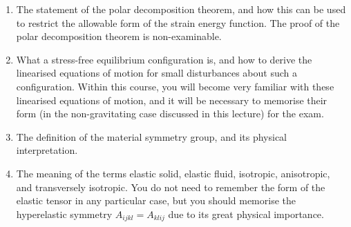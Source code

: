 \documentclass [a4paper,12pt]{paper}
\begin{document}
\begin{enumerate}
    \item[(i)] The statement of the polar decomposition theorem, and how this can be used to restrict the allowable form of the strain energy function. The proof of the polar decomposition theorem is non-examinable.
    \item[(ii)] What a stress-free equilibrium configuration is, and how to derive the linearised equations of motion for small disturbances about such a configuration. Within this course, you will become very familiar with these linearised equations of motion, and it will be necessary to memorise their form (in the non-gravitating case discussed in this lecture) for the exam.
    \item[(iii)] The definition of the material symmetry group, and its physical interpretation.
    \item[(iv)] The meaning of the terms elastic solid, elastic fluid, isotropic, anisotropic, and transversely isotropic. You do not need to remember the form of the elastic tensor in any particular case, but you should memorise the hyperelastic symmetry $A_{ijkl} = A_{klij}$ due to its great physical importance.
\end{enumerate}
\end{document}
